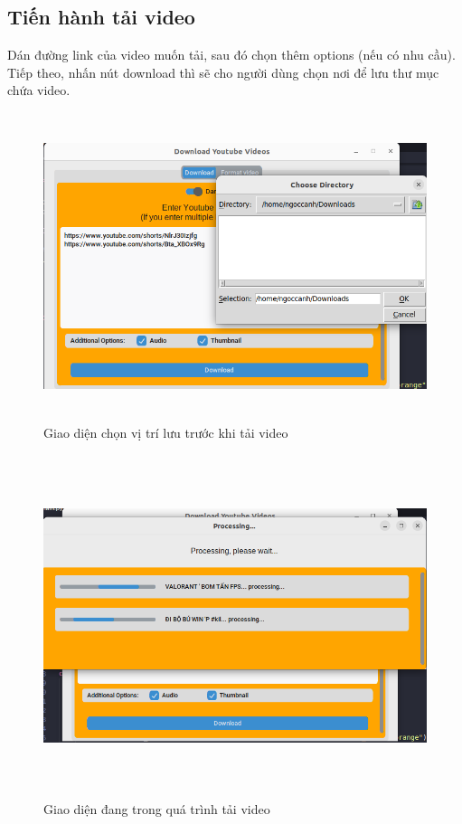 \documentclass{article} %
\begin{document}
\subsection{Tiến hành tải video}
Dán đường link của video muốn tải, sau đó chọn thêm options (nếu có nhu cầu). Tiếp theo, nhấn nút download thì sẽ cho người dùng chọn nơi để lưu thư mục chứa video.
\begin{figure}[H]
    \centering
    \includegraphics[width=15cm, height=9cm]{images/tienhanh1.PNG}
    \caption{Giao diện chọn vị trí lưu trước khi tải video}
    \label{fig:enter-label}
\end{figure}
\begin{figure}[H]
    \centering
    \includegraphics[width=15cm, height=10cm]{images/tienhanh2.PNG}
    \caption{Giao diện đang trong quá trình tải video}
    \label{fig:enter-label}
\end{figure}
\end{document}
